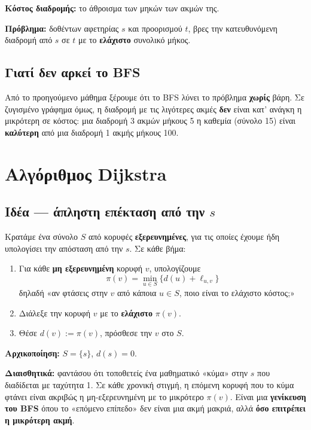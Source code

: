 \documentclass[11pt,a4paper]{article}
\begin{document}
\textbf{Κόστος διαδρομής:} το άθροισμα των μηκών των ακμών της.

\textbf{Πρόβλημα:} δοθέντων αφετηρίας $s$ και προορισμού $t$, βρες την
κατευθυνόμενη διαδρομή από $s$ σε $t$ με το \textbf{ελάχιστο} συνολικό μήκος.

\subsection{Γιατί δεν αρκεί το BFS}

Από το προηγούμενο μάθημα ξέρουμε ότι το BFS λύνει το πρόβλημα \textbf{χωρίς}
βάρη. Σε ζυγισμένο γράφημα όμως, η διαδρομή με τις λιγότερες ακμές \textbf{δεν}
είναι κατ' ανάγκη η μικρότερη σε κόστος: μια διαδρομή 3 ακμών μήκους 5 η καθεμία
(σύνολο 15) είναι \textbf{καλύτερη} από μια διαδρομή 1 ακμής μήκους 100.

\section{Αλγόριθμος Dijkstra}

\subsection{Ιδέα --- άπληστη επέκταση από την $s$}

Κρατάμε ένα σύνολο $S$ από κορυφές \textbf{εξερευνημένες}, για τις οποίες έχουμε
ήδη υπολογίσει την απόσταση από την $s$. Σε κάθε βήμα:
\begin{enumerate}
  \item Για κάθε \textbf{μη εξερευνημένη} κορυφή $v$, υπολογίζουμε
  \[
  \pi(v) = \min_{u \in S}\bigl\{ d(u) + \ell_{u,v} \bigr\}
  \]
  δηλαδή «αν φτάσεις στην $v$ από κάποια $u \in S$, ποιο είναι το ελάχιστο
  κόστος;»
  \item Διάλεξε την κορυφή $v$ με το \textbf{ελάχιστο} $\pi(v)$.
  \item Θέσε $d(v) := \pi(v)$, πρόσθεσε την $v$ στο $S$.
\end{enumerate}
\textbf{Αρχικοποίηση:} $S = \{s\}$, $d(s) = 0$.

\begin{intuition}
\textbf{Διαισθητικά:} φαντάσου ότι τοποθετείς ένα μαθηματικό «κύμα» στην $s$ που
διαδίδεται με ταχύτητα 1. Σε κάθε χρονική στιγμή, η επόμενη κορυφή που το κύμα
φτάνει είναι ακριβώς η μη-εξερευνημένη με το μικρότερο $\pi(v)$. Είναι μια
\textbf{γενίκευση του BFS} όπου το «επόμενο επίπεδο» δεν είναι μια ακμή μακριά,
αλλά \textbf{όσο επιτρέπει η μικρότερη ακμή}.
\end{intuition}
\end{document}
